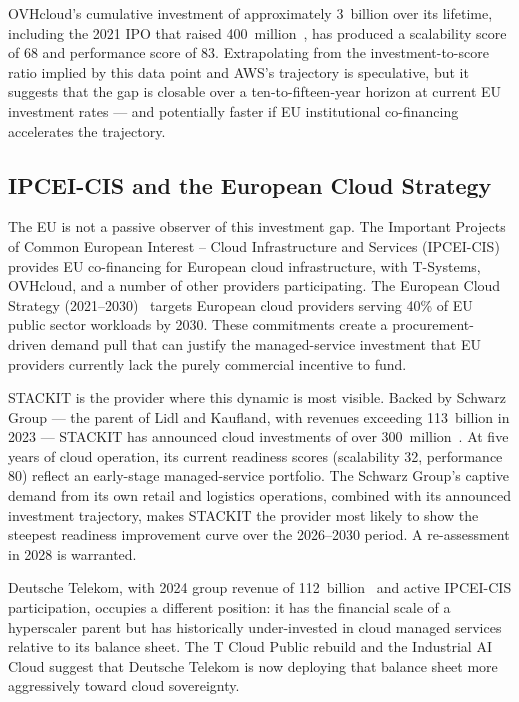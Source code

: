 OVHcloud's cumulative investment of approximately \texteuro{}3~billion over its lifetime, including the 2021 IPO that raised \texteuro{}400~million~\cite{OVHcloud_IPO}, has produced a scalability score of 68 and performance score of 83. Extrapolating from the investment-to-score ratio implied by this data point and AWS's trajectory is speculative, but it suggests that the gap is closable over a ten-to-fifteen-year horizon at current EU investment rates — and potentially faster if EU institutional co-financing accelerates the trajectory.

\subsection{IPCEI-CIS and the European Cloud Strategy}

The EU is not a passive observer of this investment gap. The Important Projects of Common European Interest -- Cloud Infrastructure and Services (IPCEI-CIS)~\cite{IPCEI_CIS_2023} provides EU co-financing for European cloud infrastructure, with T-Systems, OVHcloud, and a number of other providers participating. The European Cloud Strategy (2021--2030)~\cite{EC_CloudStrategy_2021} targets European cloud providers serving 40\% of EU public sector workloads by 2030. These commitments create a procurement-driven demand pull that can justify the managed-service investment that EU providers currently lack the purely commercial incentive to fund.

STACKIT is the provider where this dynamic is most visible. Backed by Schwarz Group — the parent of Lidl and Kaufland, with revenues exceeding \texteuro{}113~billion in 2023 — STACKIT has announced cloud investments of over \texteuro{}300~million~\cite{STACKIT_About}. At five years of cloud operation, its current readiness scores (scalability 32, performance 80) reflect an early-stage managed-service portfolio. The Schwarz Group's captive demand from its own retail and logistics operations, combined with its announced investment trajectory, makes STACKIT the provider most likely to show the steepest readiness improvement curve over the 2026--2030 period. A re-assessment in 2028 is warranted.

Deutsche Telekom, with 2024 group revenue of \texteuro{}112~billion~\cite{OTC_About} and active IPCEI-CIS participation, occupies a different position: it has the financial scale of a hyperscaler parent but has historically under-invested in cloud managed services relative to its balance sheet. The T Cloud Public rebuild and the Industrial AI Cloud suggest that Deutsche Telekom is now deploying that balance sheet more aggressively toward cloud sovereignty.

